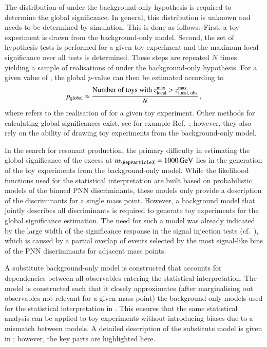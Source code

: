 The distribution of \Zmaxlocal under the background-only hypothesis is required
to determine the global significance. In general, this distribution is unknown
and needs to be determined by simulation. This is done as follows:~First, a toy
experiment is drawn from the background-only model. Second, the set of
hypothesis tests is performed for a given toy experiment and the maximum local
significance over all tests is determined. These steps are repeated $N$ times
yielding a sample of realisations of \Zmaxlocal under the background-only
hypothesis. For a given value of \zmaxlocalobs, the global $p$-value can then be
estimated according to
\begin{align*}
  p_{\text{global}} \approx
  \frac{
  \text{Number of toys with } z_{\text{local}}^{\text{max}} > z_{\text{local, obs}}^{\text{max}}
  }{
  N
  } \,\text{,}
\end{align*}
where \zmaxlocal refers to the realisation of \Zmaxlocal for a given toy
experiment. Other methods for calculating global significances exist, see for
example Ref.~\cite{Gross:2010qma}; however, they also rely on the ability of
drawing toy experiments from the background-only model.

In the search for resonant \HH production, the primary difficulty in estimating
the global significance of the excess at $\mX = \SI{1000}{\GeV}$ lies in the
generation of the toy experiments from the background-only model. While the
likelihood functions used for the statistical interpretation are built based on
probabilistic models of the binned PNN discriminants, these models only provide
a description of the discriminants for a single mass point. However, a
background model that jointly describes all discriminants is required to
generate toy experiments for the global significance estimation. The need for
such a model was already indicated by the large width of the significance
response in the signal injection tests (cf.~),
which is caused by a partial overlap of events selected by the most signal-like
bins of the PNN discriminants for adjacent mass points.

A substitute background-only model is constructed that accounts for dependencies
between all observables entering the statistical interpretation. The model is
constructed such that it closely approximates (after marginalising out
observables not relevant for a given mass point) the background-only models used
for the statistical interpretation in . This ensures that
the same statistical analysis can be applied to toy experiments without
introducing biases due to a mismatch between models. A detailed description of
the substitute model is given in ; however, the key
parts are highlighted here.

